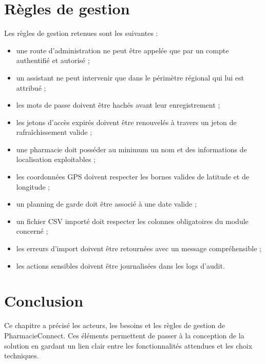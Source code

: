 \section{Règles de gestion}

Les règles de gestion retenues sont les suivantes :

\begin{itemize}
    \item une route d'administration ne peut être appelée que par un compte authentifié et autorisé ;
    \item un assistant ne peut intervenir que dans le périmètre régional qui lui est attribué ;
    \item les mots de passe doivent être hachés avant leur enregistrement ;
    \item les jetons d'accès expirés doivent être renouvelés à travers un jeton de rafraîchissement valide ;
    \item une pharmacie doit posséder au minimum un nom et des informations de localisation exploitables ;
    \item les coordonnées GPS doivent respecter les bornes valides de latitude et de longitude ;
    \item un planning de garde doit être associé à une date valide ;
    \item un fichier CSV importé doit respecter les colonnes obligatoires du module concerné ;
    \item les erreurs d'import doivent être retournées avec un message compréhensible ;
    \item les actions sensibles doivent être journalisées dans les logs d'audit.
\end{itemize}

\section{Conclusion}

Ce chapitre a précisé les acteurs, les besoins et les règles de gestion de PharmacieConnect. Ces éléments
permettent de passer à la conception de la solution en gardant un lien clair entre les fonctionnalités
attendues et les choix techniques.
